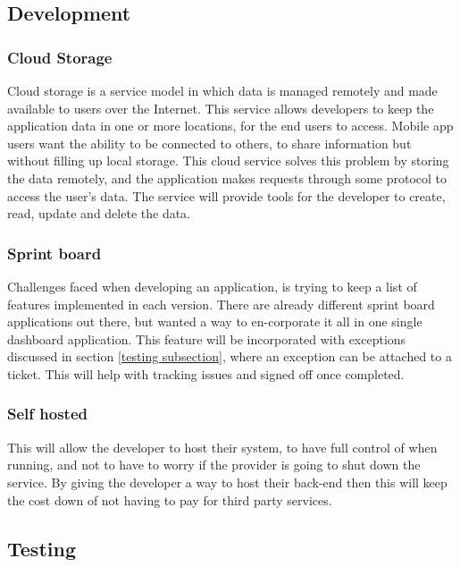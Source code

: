 \subsection{Development}

\subsubsection{Cloud Storage} \label{d-d:cloud_storage}

Cloud storage is a service model in which data is managed remotely and made available to users over the Internet. This service allows developers to keep the application data in one or more locations, for the end users to access. Mobile app users want the ability to be connected to others, to share information but without filling up local storage. This cloud service solves this problem by storing the data remotely, and the application makes requests through some protocol to access the user's data. The service will provide tools for the developer to create, read, update and delete the data.

\subsubsection{Sprint board} \label{d-d:sprint_board}
Challenges faced when developing an application, is trying to keep a list of features implemented in each version. There are already different sprint board applications out there, but wanted a way to en-corporate it all in one single dashboard application. This feature will be incorporated with exceptions discussed in section \ref{testing subsection}, where an exception can be attached to a ticket. This will help with tracking issues and signed off once completed.

\subsubsection{Self hosted} \label{d-d:self_hosted}
This will allow the developer to host their system, to have full control of when running, and not to have to worry if the provider is going to shut down the service. By giving the developer a way to host their back-end then this will keep the cost down of not having to pay for third party services.

\subsection{Testing} 

